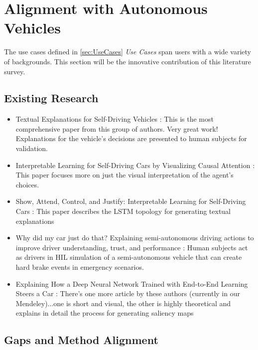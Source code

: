 \section{Alignment with Autonomous Vehicles}\label{sec:Alignment}

The use cases defined in \ref{sec:UseCases} \textit{Use Cases} span users with a wide variety of backgrounds.  This section will be the innovative contribution of this literature survey.

\subsection{Existing Research}

\begin{itemize}
    \item Textual Explanations for Self-Driving Vehicles \cite{kim2018textual}: This is the most comprehensive paper from this group of authors.  Very great work!  Explanations for the vehicle's decisions are presented to human subjects for validation.

    \item Interpretable Learning for Self-Driving Cars by Visualizing Causal Attention \cite{Kim2017InterpretableLF}:  This paper focuses more on just the visual interpretation of the agent's choices.

    \item Show, Attend, Control, and Justify: Interpretable Learning for Self-Driving Cars \cite{Kim2017ShowA}: This paper describes the LSTM topology for generating textual explanations

    \item Why did my car just do that? Explaining semi-autonomous driving actions to improve driver understanding, trust, and performance \cite{Koo2015}:  Human subjects act as drivers in HIL simulation of a semi-autonomous vehicle that can create hard brake events in emergency scenarios.
    
    \item Explaining How a Deep Neural Network Trained with End-to-End Learning Steers a Car \cite{Bojarski2017ExplainingHA}: There's one more article by these authors (currently in our Mendeley)...one is short and visual, the other is highly theoretical and explains in detail the process for generating saliency maps
\end{itemize}

\subsection{Gaps and Method Alignment}

